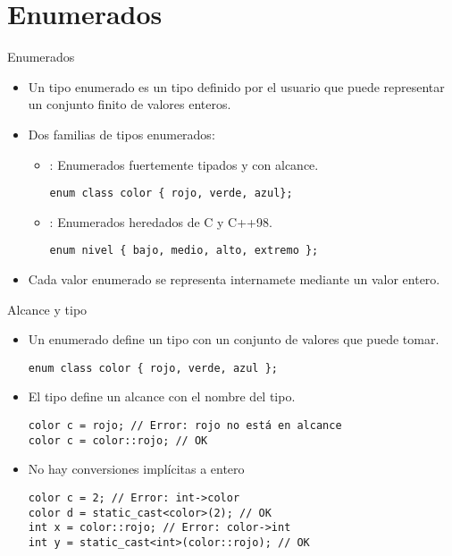 \section{Enumerados}

\begin{frame}[fragile]{Enumerados}
\begin{itemize}
  \item Un tipo enumerado es un tipo definido por el usuario que puede
        representar un conjunto finito de valores enteros.
  \item Dos familias de tipos enumerados:
    \begin{itemize}
      \item {}: Enumerados fuertemente tipados y con alcance.
\begin{lstlisting}
enum class color { rojo, verde, azul};
\end{lstlisting}
      \item {}: Enumerados heredados de C y C++98.
\begin{lstlisting}
enum nivel { bajo, medio, alto, extremo };
\end{lstlisting}
    \end{itemize}
  \item Cada valor enumerado se representa internamete mediante un valor entero.
\end{itemize}
\end{frame}

\begin{frame}[fragile]{Alcance y tipo}
\begin{itemize}
  \item Un enumerado define un tipo con un conjunto de valores que puede tomar.
\begin{lstlisting}
enum class color { rojo, verde, azul };
\end{lstlisting}
  \item El tipo define un alcance con el nombre del tipo.
\begin{lstlisting}
color c = rojo; // Error: rojo no está en alcance
color c = color::rojo; // OK
\end{lstlisting}
  \item No hay conversiones implícitas a entero
\begin{lstlisting}
color c = 2; // Error: int->color
color d = static_cast<color>(2); // OK
int x = color::rojo; // Error: color->int
int y = static_cast<int>(color::rojo); // OK
\end{lstlisting}
\end{itemize}
\end{frame}

